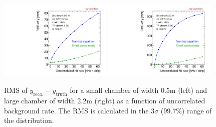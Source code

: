 \begin{figure}[!htpb]
  \begin{center}
    \includegraphics[width=0.48\textwidth]{figures/rms_y_small_vs_rate.pdf}
    \includegraphics[width=0.48\textwidth]{figures/rms_y_large_vs_rate.pdf}
  \end{center}
  \vspace{-10pt}
  \caption{RMS of $y_\text{reco.} - y_\text{truth}$ for a small chamber of width 0.5m (left) and large chamber of width 2.2m (right) as a function of uncorrelated background rate. The RMS is calculated in the $3\sigma$ (99.7\%) range of the distribution.}
  \label{fig:rms_vs_rate}
\end{figure}


